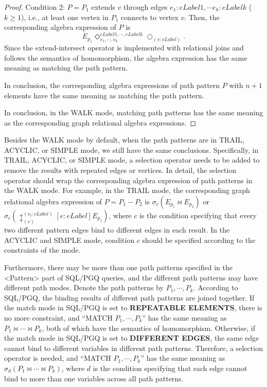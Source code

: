 \begin{proof}
    Condition 2: $P = P_1$ extends $v$ through edges $e_1:eLabel1, \cdots e_k:eLabelk$ ($k \geq 1$), i.e., at least one vertex in $P_1$ connects to vertex $v$.
    Then, the corresponding algebra expression of $P$ is 
    \begin{equation*}
        E_{p_1} \Diamond_{v_1, \cdots, v_k}^{eLabel1, \cdots, eLabelk} \bigcirc_{(v:vLabel)}.
    \end{equation*}
    Since the extend-intersect operator is implemented with relational joins and follows the semantics of homomorphism, the algebra expression has the same meaning as matching the path pattern.

    In conclusion, the corresponding algebra expressions of path pattern $P$ with $n + 1$ elements have the same meaning as matching the path pattern.

    In conclusion, in the WALK mode, matching path patterns has the same meaning as the corresponding graph relational algebra expressions.
\end{proof}


Besides the WALK mode by default, when the path patterns are in TRAIL, ACYCLIC, or SIMPLE mode, we still have the same conclusions.
Specifically, in TRAIL, ACYCLIC, or SIMPLE mode, a selection operator needs to be added to remove the results with repeated edges or vertices.
In detail, the selection operator should wrap the corresponding algebra expression of path patterns in the WALK mode.
For example, in the TRAIL mode, the corresponding graph relational algebra expression of $P = P_1 - P_2$ is $\sigma_{c}(E_{p_1} \Join E_{p_2})$ or $\sigma_{c}(\updownarrow_{(v)}^{(v_t:vLabel)}[e:eLabel]E_{p_1})$, where $c$ is the condition specifying that every two different pattern edges bind to different edges in each result.
In the ACYCLIC and SIMPLE mode, condition $c$ should be specified according to the constraints of the mode.

Furthermore, there may be more than one path patterns specified in the <Pattern> part of SQL/PGQ queries, and the different path patterns may have different path modes.
Denote the path patterns by $P_1, \cdots, P_k$.
According to SQL/PGQ, the binding results of different path patterns are joined together.
If the match mode in SQL/PGQ is set to \textbf{REPEATABLE ELEMENTS}, there is no more constraint, and ``MATCH $P_1, \cdots, P_k$'' has the same meaning as $P_1 \Join \cdots \Join P_k$, both of which have the semantics of homomorphism.
Otherwise, if the match mode in SQL/PGQ is set to \textbf{DIFFERENT EDGES}, the same edge cannot bind to different variables in different path patterns.
Therefore, a selection operator is needed, and ``MATCH $P_1, \cdots, P_k$'' has the same meaning as $\sigma_{d}(P_1 \Join \cdots \Join P_k)$, where $d$ is the condition specifying that each edge cannot bind to more than one variables across all path patterns.
